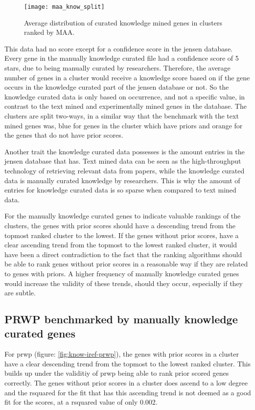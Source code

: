 \begin{sidewaysfigure}
    \texttt{[image: maa\_know\_split]}
    \caption{Average distribution of curated knowledge mined genes in clusters
    ranked by MAA.}
    \label{fig:know-iref-maa}
\end{sidewaysfigure}

This data had no score except for a confidence score in the \gls{jensen}
database. Every gene in the manually knowledge curated file had a confidence
score of 5 stars, due to being manually curated by researchers\cite{jensen}.
Therefore, the average number of genes in a cluster would receive a knowledge
score based on if the gene occurs in the knowledge curated part of the
\gls{jensen} database or not. So the knowledge curated data is only based on
occurrence, and not a specific value, in contrast to the text mined and
experimentally mined genes in the database. The clusters are split two-ways, in
a similar way that the benchmark with the text mined genes was, blue for genes
in the cluster which have priors and orange for the genes that do not have prior
scores.

Another trait the knowledge curated data possesses is the amount entries in the
\gls{jensen} database that has. Text mined data can be seen as the
high-throughput technology of retrieving relevant data from papers, while the
knowledge curated data is manually curated knowledge by researchers. This is why
the amount of entries for knowledge curated data is so sparse when compared to
text mined data.

For the manually knowledge curated genes to indicate valuable rankings of the
clusters, the genes with prior scores should have a descending trend from the
topmost ranked cluster to the lowest. If the genes without prior scores, have
a clear ascending trend from the topmost to the lowest ranked cluster, it would
have been a direct contradiction to the fact that the ranking algorithms should
be able to rank genes without prior scores in a reasonable way if they are
related to genes with priors. A higher frequency of manually knowledge curated
genes would increase the validity of these trends, should they occur,
especially if they are subtle.

\subsection{PRWP benchmarked by manually knowledge curated genes}
For \gls{prwp} (figure: \ref{fig:know-iref-prwp}), the genes with prior scores in
a cluster have a clear descending trend from the topmost to the lowest ranked
cluster. This builds up under the validitiy of \gls{prwp} being able to rank
prior scored genes correctly. The genes without prior scores in a cluster does
ascend to a low degree and the \gls{rsquared} for the fit that has this
ascending trend is not deemed as a good fit for the scores, at a \gls{rsquared}
value of only 0.002.

